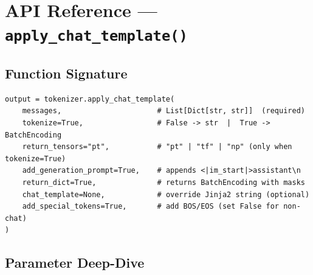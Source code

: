 \documentclass[11pt,a4paper]{article}
\begin{document}
\section{API Reference --- \texttt{apply\_chat\_template()}}

\subsection{Function Signature}

\begin{lstlisting}[style=pycode]
output = tokenizer.apply_chat_template(
    messages,                      # List[Dict[str, str]]  (required)
    tokenize=True,                 # False -> str  |  True -> BatchEncoding
    return_tensors="pt",           # "pt" | "tf" | "np" (only when tokenize=True)
    add_generation_prompt=True,    # appends <|im_start|>assistant\n
    return_dict=True,              # returns BatchEncoding with masks
    chat_template=None,            # override Jinja2 string (optional)
    add_special_tokens=True,       # add BOS/EOS (set False for non-chat)
)
\end{lstlisting}

\subsection{Parameter Deep-Dive}
\end{document}
